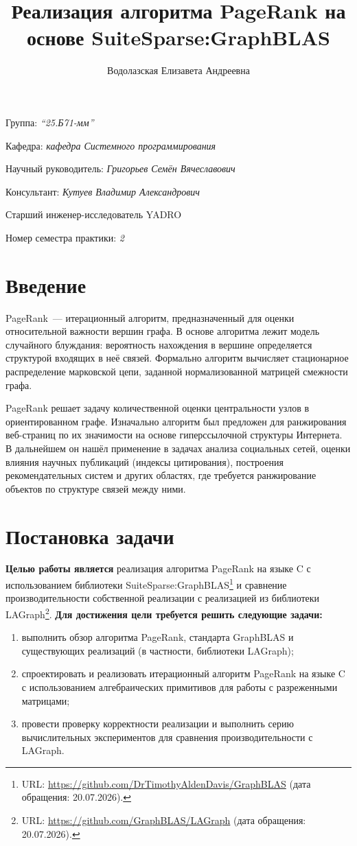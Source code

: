 \documentclass[a4paper]{article}
\title{Реализация алгоритма PageRank на основе SuiteSparse:GraphBLAS}
\author{Водолазская Елизавета Андреевна}
\date{}
\begin{document}
\maketitle

\begin{flushright}
    Группа: \emph{\enquote{25.Б71-мм}}

    Кафедра: \emph{кафедра Системного программирования}

    Научный руководитель: \emph{Григорьев Семён Вячеславович}

    Консультант: \emph{Кутуев Владимир Александрович}

    Старший инженер-исследователь YADRO

    Номер семестра практики: \emph{2}
\end{flushright}

\section{Введение}
PageRank~--- итерационный алгоритм, предназначенный для оценки относительной важности вершин графа. В основе алгоритма лежит модель случайного блуждания: вероятность нахождения в вершине определяется структурой входящих в неё связей. Формально алгоритм вычисляет стационарное распределение марковской цепи, заданной нормализованной матрицей смежности графа.

PageRank решает задачу количественной оценки центральности узлов в ориентированном графе. Изначально алгоритм был предложен для ранжирования веб-страниц по их значимости на основе гиперссылочной структуры Интернета. В дальнейшем он нашёл применение в задачах анализа социальных сетей, оценки влияния научных публикаций (индексы цитирования), построения рекомендательных систем и других областях, где требуется ранжирование объектов по структуре связей между ними.
\section{Постановка задачи}

\textbf{Целью работы является} реализация алгоритма PageRank на языке C с использованием библиотеки SuiteSparse:GraphBLAS\footnote{URL: \url{https://github.com/DrTimothyAldenDavis/GraphBLAS} (дата обращения: 20.07.2026).} и сравнение производительности собственной реализации с реализацией из библиотеки LAGraph\footnote{URL: \url{https://github.com/GraphBLAS/LAGraph} (дата обращения: 20.07.2026).}.
\textbf{Для достижения цели требуется решить следующие задачи:}
\begin{enumerate}
\item выполнить обзор алгоритма PageRank, стандарта GraphBLAS и существующих реализаций (в частности, библиотеки LAGraph);
\item спроектировать и реализовать итерационный алгоритм PageRank на языке C с использованием алгебраических примитивов для работы с разреженными матрицами;
\item провести проверку корректности реализации и выполнить серию вычислительных экспериментов для сравнения производительности с LAGraph.
\end{enumerate}
\end{document}
